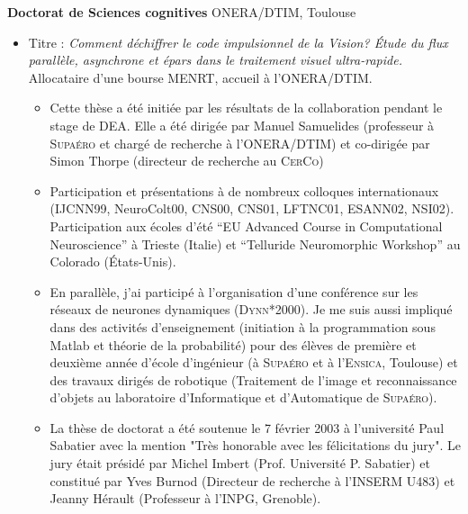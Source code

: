 	 
\vspace*{.3cm} 
	\textbf{Doctorat de Sciences cognitives} ONERA/DTIM, Toulouse \hfill {} \\
\vspace*{-.15in}
\begin{itemize}
\item[] Titre : \emph{Comment déchiffrer le code impulsionnel de la Vision? \'Etude du flux parallèle, asynchrone et épars  dans le traitement visuel ultra-rapide.}  Allocataire d'une bourse MENRT, accueil à  l'ONERA/DTIM. 
\begin{itemize}
		\item %
		Cette thèse a été initiée par les résultats de la collaboration pendant le stage de DEA. Elle a été dirigée par Manuel Samuelides (professeur à  \textsc{Supaéro} et chargé de recherche à  l'ONERA/DTIM) et co-dirigée par Simon Thorpe (directeur de recherche au \textsc{CerCo})
		\item Participation et présentations à  de nombreux colloques internationaux (IJCNN99, NeuroColt00, CNS00, CNS01, LFTNC01, ESANN02, NSI02). Participation aux écoles d'été ``EU Advanced Course in Computational Neuroscience'' à  Trieste (Italie) et ``Telluride Neuromorphic Workshop'' au Colorado (\'Etats-Unis).
		\item %
		En parallèle, j'ai participé à  l'organisation d'une conférence sur les réseaux de neurones dynamiques (\textsc{Dynn}*2000). Je me suis aussi impliqué dans des activités d'enseignement (initiation à  la programmation sous Matlab et théorie de la probabilité) pour des élèves de première et deuxième année d'école d'ingénieur (à  \textsc{Supaéro} et à  l'\textsc{Ensica}, Toulouse) et des travaux dirigés de robotique (Traitement de l'image et reconnaissance d'objets au laboratoire d'Informatique et d'Automatique de \textsc{Supaéro}). %
		\item %
		La thèse de doctorat a été soutenue le 7 février 2003 à  l'université Paul Sabatier avec la mention "Très honorable avec les félicitations du jury". Le jury était présidé par Michel Imbert (Prof. Université P. Sabatier) et constitué par Yves Burnod (Directeur de recherche à  l'\textsc{INSERM} U483) et Jeanny Hérault (Professeur à  l'INPG, Grenoble). 
	\end{itemize} %
\end{itemize} %


